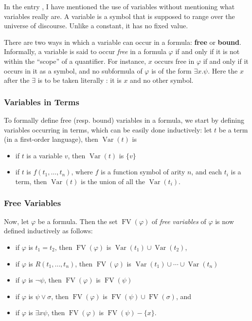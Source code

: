 \documentclass[12pt]{article}
\renewcommand{\t}{{t}}
\begin{document}

In the entry , I have mentioned the use of variables without mentioning what variables really are.  A variable is a symbol that is supposed to range over the universe of discourse.  Unlike a constant, it has no fixed value.

There are two ways in which a variable can occur in a formula: {\bf free} or {\bf bound}.  Informally, a variable is said to occur {\em free} in a formula $\varphi$ if and only if it is not within the ``scope'' of a quantifier.  For instance, $x$ occurs free in $\varphi$ if and only if it occurs in it as a symbol, and no subformula of $\varphi$ is of the form $\exists x.\psi$.  Here the $x$ after the $\exists$ is to be taken literally : it is $x$ and no other symbol.

\subsubsection*{Variables in Terms}

To formally define free (resp. bound) variables in a formula, we start by defining variables occurring in terms, which can be easily done inductively: let $\t$ be a term (in a first-order language), then $\operatorname{Var}(t)$ is
\begin{itemize}
\item if $t$ is a variable $v$, then $\operatorname{Var}(t)$ is $\lbrace v\rbrace$
\item if $t$ is $f(t_1,\ldots, t_n)$, where $f$ is a function symbol of arity $n$, and each $t_i$ is a term, then $\operatorname{Var}(t)$ is the union of all the $\operatorname{Var}(t_i)$.
\end{itemize}

\subsubsection*{Free Variables}

Now, let $\varphi$ be a formula.  Then the set $\operatorname{FV}(\varphi)$ of \emph{free variables} of $\varphi$ is now defined inductively as follows:
\begin{itemize}
\item if $\varphi$ is $t_1=t_2$, then $\operatorname{FV}(\varphi)$ is $\operatorname{Var}(t_1) \cup \operatorname{Var}(t_2)$,
\item if $\varphi$ is $R(t_1,\ldots,t_n)$, then $\operatorname{FV}(\varphi)$ is $\operatorname{Var}(t_1) \cup \cdots \cup \operatorname{Var}(t_n)$
\item if $\varphi$ is $\neg \psi$, then $\operatorname{FV}(\varphi)$ is $\operatorname{FV}(\psi)$
\item if $\varphi$ is $\psi \vee \sigma$, then $\operatorname{FV}(\varphi)$ is $\operatorname{FV}(\psi) \cup \operatorname{FV}(\sigma)$, and
\item if $\varphi$ is $\exists x \psi$, then $\operatorname{FV}(\varphi)$ is $\operatorname{FV}(\psi)-\lbrace x \rbrace$.
\end{itemize}
\end{document}
